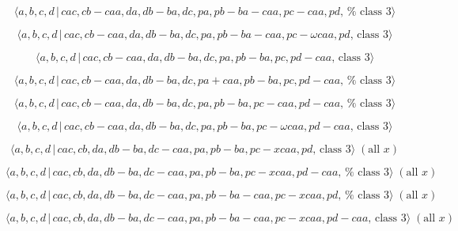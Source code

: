 \documentclass[10pt]{article}
\begin{document}
\begin{equation}
\langle a,b,c,d\,|\,cac,cb-caa,da,db-ba,dc,pa,pb-ba-caa,pc-caa,pd,\,\text{%
class }3\rangle  \tag{7.4197}
\end{equation}

\begin{equation}
\langle a,b,c,d\,|\,cac,cb-caa,da,db-ba,dc,pa,pb-ba-caa,pc-\omega caa,pd,\,%
\text{class }3\rangle  \tag{7.4198}
\end{equation}

\begin{equation}
\langle a,b,c,d\,|\,cac,cb-caa,da,db-ba,dc,pa,pb-ba,pc,pd-caa,\,\text{class }%
3\rangle  \tag{7.4199}
\end{equation}

\begin{equation}
\langle a,b,c,d\,|\,cac,cb-caa,da,db-ba,dc,pa+caa,pb-ba,pc,pd-caa,\,\text{%
class }3\rangle  \tag{7.4200}
\end{equation}

\begin{equation}
\langle a,b,c,d\,|\,cac,cb-caa,da,db-ba,dc,pa,pb-ba,pc-caa,pd-caa,\,\text{%
class }3\rangle  \tag{7.4201}
\end{equation}

\begin{equation}
\langle a,b,c,d\,|\,cac,cb-caa,da,db-ba,dc,pa,pb-ba,pc-\omega caa,pd-caa,\,%
\text{class }3\rangle  \tag{7.4202}
\end{equation}

\begin{equation}
\langle a,b,c,d\,|\,cac,cb,da,db-ba,dc-caa,pa,pb-ba,pc-xcaa,pd,\,\text{class 
}3\rangle \;(\text{all }x)  \tag{7.4203}
\end{equation}

\begin{equation}
\langle a,b,c,d\,|\,cac,cb,da,db-ba,dc-caa,pa,pb-ba,pc-xcaa,pd-caa,\,\text{%
class }3\rangle \;(\text{all }x)  \tag{7.4204}
\end{equation}

\begin{equation}
\langle a,b,c,d\,|\,cac,cb,da,db-ba,dc-caa,pa,pb-ba-caa,pc-xcaa,pd,\,\text{%
class }3\rangle \;(\text{all }x)  \tag{7.4205}
\end{equation}

\begin{equation}
\langle a,b,c,d\,|\,cac,cb,da,db-ba,dc-caa,pa,pb-ba-caa,pc-xcaa,pd-caa,\,%
\text{class }3\rangle \;(\text{all }x)  \tag{7.4206}
\end{equation}
\end{document}
